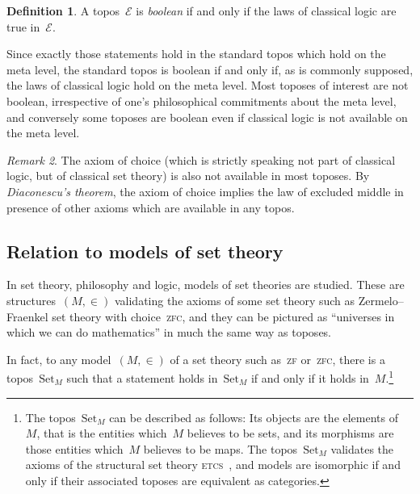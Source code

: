 \documentclass[oneside,reqno]{amsart}
\theoremstyle{definition}
\newtheorem{defn}{Definition}[section]
\theoremstyle{plain}
\theoremstyle{remark}
\newtheorem{rem}[defn]{Remark}
\newcommand{\E}{\mathcal{E}}
\newcommand{\Set}{\mathrm{Set}}
\renewcommand{\_}{\mathpunct{.}\,}
\newcommand{\?}{\,{:}\,}
\begin{document}
\begin{defn}A topos~$\E$ is \emph{boolean} if and only if the laws of classical
logic are true in~$\E$.\end{defn}

Since exactly those statements hold in the standard topos which hold on the
meta level, the standard topos is boolean if and only if, as is commonly supposed, the laws
of classical logic hold on the meta level. Most toposes of interest are not
boolean, irrespective of one's philosophical commitments about the meta level,
and conversely some toposes are boolean even if classical logic is not
available on the meta level.

\begin{rem}The axiom of choice (which is strictly speaking not part of
classical logic, but of classical set theory) is also not available in most
toposes. By \emph{Diaconescu's theorem}, the axiom of choice implies the law of
excluded middle in presence of other axioms which are available in any topos.
\end{rem}




\subsection{Relation to models of set theory} In set theory, philosophy and
logic, models of set theories are studied. These are structures~$(M,\in)$
validating the axioms of some set theory such as Zermelo--Fraenkel set theory
with choice~\textsc{zfc}, and they can be pictured as ``universes in which we
can do mathematics'' in much the same way as toposes.

In fact, to any model~$(M,\in)$ of a set theory such as~\textsc{zf}
or~\textsc{zfc}, there is a topos~$\Set_M$ such that a statement holds
in~$\Set_M$ if and only if it holds in~$M$.\footnote{The topos~$\Set_M$ can be
described as follows: Its objects are the elements of~$M$, that is the entities
which~$M$ believes to be sets, and its morphisms are those entities which~$M$
believes to be maps. The topos~$\Set_M$ validates the axioms of the structural
set theory \textsc{etcs}~\cite{mclarty:structuralism,marquis:foundations,barton-friedman:structures}, and models are isomorphic if and only if their
associated toposes are equivalent as categories.}
\end{document}
